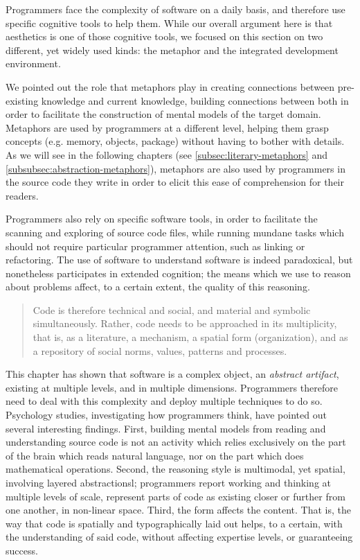 \spacersmall

Programmers face the complexity of software on a daily basis, and therefore use specific cognitive tools to help them. While our overall argument here is that aesthetics is one of those cognitive tools, we focused on this section on two different, yet widely used kinds: the metaphor and the integrated development environment.

We pointed out the role that metaphors play in creating connections between pre-existing knowledge and current knowledge, building connections between both in order to facilitate the construction of mental models of the target domain. Metaphors are used by programmers at a different level, helping them grasp concepts (e.g. memory, objects, package) without having to bother with details. As we will see in the following chapters (see \ref{subsec:literary-metaphors} and \ref{subsubsec:abstraction-metaphors}), metaphors are also used by programmers in the source code they write in order to elicit this ease of comprehension for their readers.

Programmers also rely on specific software tools, in order to facilitate the scanning and  exploring of source code files, while running mundane tasks which should not require particular programmer attention, such as linking or refactoring. The use of software to understand software is indeed paradoxical, but nonetheless participates in extended cognition; the means which we use to reason about problems affect, to a certain extent, the quality of this reasoning.

\spacer

\begin{quote}
    Code is therefore technical and social, and material and symbolic simultaneously. Rather, code needs to be approached in its multiplicity, that is, as a literature, a mechanism, a spatial form (organization), and as a repository of social norms, values, patterns and processes. \citep{berry_philosophy_2011}
\end{quote}

This chapter has shown that software is a complex object, an \emph{abstract artifact}, existing at multiple levels, and in multiple dimensions. Programmers therefore need to deal with this complexity and deploy multiple techniques to do so. Psychology studies, investigating how programmers think, have pointed out several interesting findings. First, building mental models from reading and understanding source code is not an activity which relies exclusively on the part of the brain which reads natural language, nor on the part which does mathematical operations. Second, the reasoning style is multimodal, yet spatial, involving layered abstractionsl; programmers report working and thinking at multiple levels of scale, represent parts of code as existing closer or further from one another, in non-linear space. Third, the form affects the content. That is, the way that code is spatially and typographically laid out helps, to a certain, with the understanding of said code, without affecting expertise levels, or guaranteeing success.

